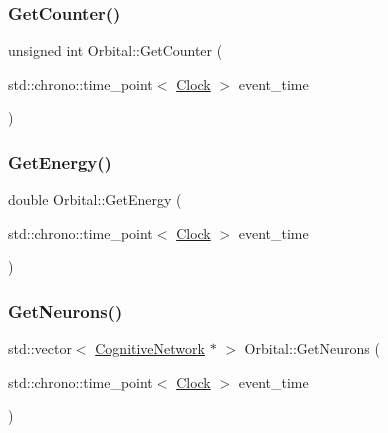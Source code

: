 \mbox{\label{classOrbital_ae46443496d38a22f1da8f7f063d420bc}} 
\subsubsection{\texorpdfstring{Get\+Counter()}{GetCounter()}}
{\footnotesize\ttfamily unsigned int Orbital\+::\+Get\+Counter (\begin{DoxyParamCaption}\item[{std\+::chrono\+::time\+\_\+point$<$ \mbox{\hyperlink{universe_8h_a0ef8d951d1ca5ab3cfaf7ab4c7a6fd80}{Clock}} $>$}]{event\+\_\+time }\end{DoxyParamCaption})\hspace{0.3cm}{\ttfamily [inline]}}

\mbox{\label{classOrbital_a6748a8f75bfd255c1a53a5061d4e14e1}} 
\subsubsection{\texorpdfstring{Get\+Energy()}{GetEnergy()}}
{\footnotesize\ttfamily double Orbital\+::\+Get\+Energy (\begin{DoxyParamCaption}\item[{std\+::chrono\+::time\+\_\+point$<$ \mbox{\hyperlink{universe_8h_a0ef8d951d1ca5ab3cfaf7ab4c7a6fd80}{Clock}} $>$}]{event\+\_\+time }\end{DoxyParamCaption})\hspace{0.3cm}{\ttfamily [inline]}}

\mbox{\label{classOrbital_a7d7e4b7cb0d009a5e7224b6f758d7b6b}} 
\subsubsection{\texorpdfstring{Get\+Neurons()}{GetNeurons()}}
{\footnotesize\ttfamily std\+::vector$<$ \mbox{\hyperlink{classCognitiveNetwork}{Cognitive\+Network}} $\ast$ $>$ Orbital\+::\+Get\+Neurons (\begin{DoxyParamCaption}\item[{std\+::chrono\+::time\+\_\+point$<$ \mbox{\hyperlink{universe_8h_a0ef8d951d1ca5ab3cfaf7ab4c7a6fd80}{Clock}} $>$}]{event\+\_\+time }\end{DoxyParamCaption})}

